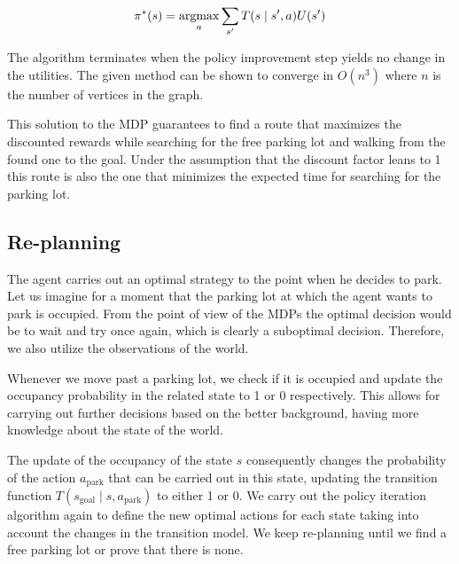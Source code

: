 \begin{equation}
\label{lbl:optimal_policy}
\pi^*(s) = \mathop{\rm argmax}_a \sum_{s'} T(s \mid s', a)U(s')
\end{equation}

The algorithm terminates when the policy improvement step yields no change in
the utilities. The given method can be shown to converge in $O(n^3)$ where $n$
is the number of vertices in the graph.

This solution to the MDP guarantees to find a route that maximizes the
discounted rewards while searching for the free parking lot and walking from
the found one to the goal. Under the assumption that the discount factor leans
to 1 this route is also the one that minimizes the expected time for searching
for the parking lot.

\subsection{Re-planning} %
\label{sub:re_planning}

The agent carries out an optimal strategy to the point when he decides to
park. Let us imagine for a moment that the parking lot at which the agent
wants to park is occupied. From the point of view of the MDPs the optimal
decision would be to wait and try once again, which is clearly a suboptimal
decision. Therefore, we also utilize the observations of the world.

Whenever we move past a parking lot, we check if it is occupied and update the
occupancy probability in the related state to 1 or 0 respectively. This allows
for carrying out further decisions based on the better background, having more
knowledge about the state of the world.

The update of the occupancy of the state $s$ consequently changes the
probability of the action $a_\mathrm{park}$ that can be carried out in this
state, updating the transition function $T(s_\mathrm{goal} \mid s,
a_\mathrm{park})$ to either 1 or 0. We carry out the policy iteration
algorithm again to define the new optimal actions for each state taking into
account the changes in the transition model. We keep re-planning until we find
a free parking lot or prove that there is none.


